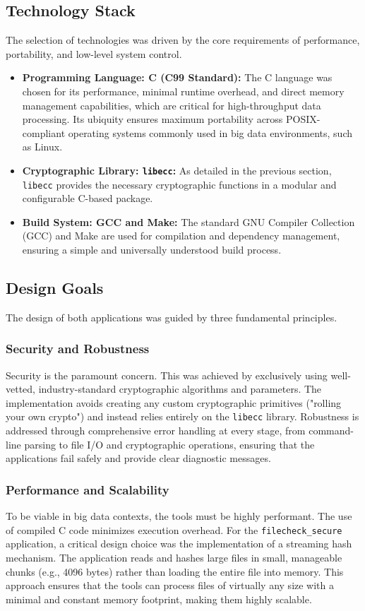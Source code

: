 \documentclass[12pt, letterpaper]{article}
\begin{document}
\subsection{Technology Stack}
The selection of technologies was driven by the core requirements of performance, portability, and low-level system control.
\begin{itemize}
	\item \textbf{Programming Language: C (C99 Standard):} The C language was chosen for its performance, minimal runtime overhead, and direct memory management capabilities, which are critical for high-throughput data processing. Its ubiquity ensures maximum portability across POSIX-compliant operating systems commonly used in big data environments, such as Linux.
	\item \textbf{Cryptographic Library: \texttt{libecc}:} As detailed in the previous section, \texttt{libecc} provides the necessary cryptographic functions in a modular and configurable C-based package.
	\item \textbf{Build System: GCC and Make:} The standard GNU Compiler Collection (GCC) and Make are used for compilation and dependency management, ensuring a simple and universally understood build process.
\end{itemize}

\subsection{Design Goals}
The design of both applications was guided by three fundamental principles.

\subsubsection{Security and Robustness}
Security is the paramount concern. This was achieved by exclusively using well-vetted, industry-standard cryptographic algorithms and parameters. The implementation avoids creating any custom cryptographic primitives ("rolling your own crypto") and instead relies entirely on the \texttt{libecc} library. Robustness is addressed through comprehensive error handling at every stage, from command-line parsing to file I/O and cryptographic operations, ensuring that the applications fail safely and provide clear diagnostic messages.

\subsubsection{Performance and Scalability}
To be viable in big data contexts, the tools must be highly performant. The use of compiled C code minimizes execution overhead. For the \texttt{filecheck\_secure} application, a critical design choice was the implementation of a streaming hash mechanism. The application reads and hashes large files in small, manageable chunks (e.g., 4096 bytes) rather than loading the entire file into memory. This approach ensures that the tools can process files of virtually any size with a minimal and constant memory footprint, making them highly scalable.
\end{document}

